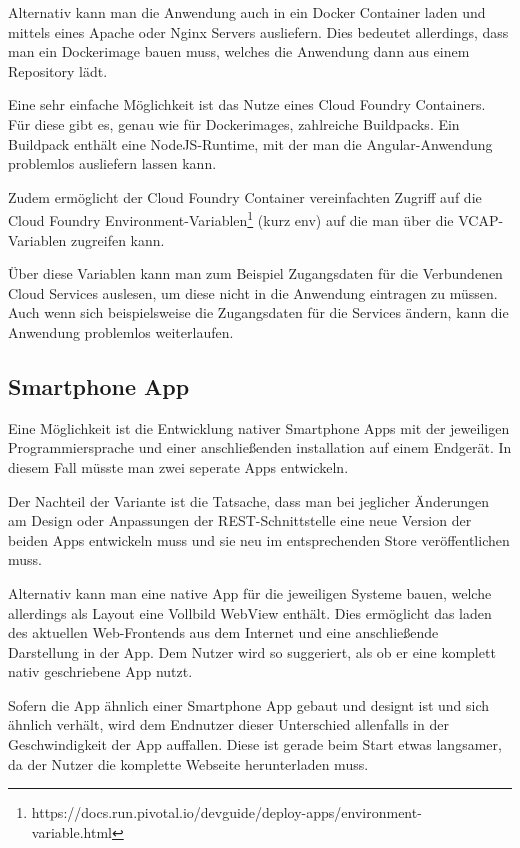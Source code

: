 Alternativ kann man die Anwendung auch in ein Docker Container laden und mittels eines Apache oder Nginx Servers
ausliefern. Dies bedeutet allerdings, dass man ein Dockerimage bauen muss, welches die Anwendung dann aus einem
Repository lädt.

Eine sehr einfache Möglichkeit ist das Nutze eines Cloud Foundry Containers. Für diese gibt es, genau wie für
Dockerimages, zahlreiche Buildpacks. Ein Buildpack enthält eine NodeJS-Runtime, mit der man die Angular-Anwendung
problemlos ausliefern lassen kann.

Zudem ermöglicht der Cloud Foundry Container vereinfachten Zugriff auf die Cloud Foundry
Environment-Variablen\footnote{https://docs.run.pivotal.io/devguide/deploy-apps/environment-variable.html} (kurz env)
auf die man über die VCAP-Variablen zugreifen kann.

Über diese Variablen kann man zum Beispiel Zugangsdaten für die Verbundenen Cloud Services auslesen, um diese nicht in
die Anwendung eintragen zu müssen. Auch wenn sich beispielsweise die Zugangsdaten für die Services ändern, kann die
Anwendung problemlos weiterlaufen.

\subsection{Smartphone App}
Eine Möglichkeit ist die Entwicklung nativer Smartphone Apps mit der jeweiligen Programmiersprache und einer
anschließenden installation auf einem Endgerät. In diesem Fall müsste man zwei seperate Apps entwickeln.

Der Nachteil der Variante ist die Tatsache, dass man bei jeglicher Änderungen am Design oder Anpassungen der
REST-Schnittstelle eine neue Version der beiden Apps entwickeln muss und sie neu im entsprechenden Store veröffentlichen
muss.

Alternativ kann man eine native App für die jeweiligen Systeme bauen, welche allerdings als Layout eine Vollbild WebView
enthält. Dies ermöglicht das laden des aktuellen Web-Frontends aus dem Internet und eine anschließende Darstellung in
der App. Dem Nutzer wird so suggeriert, als ob er eine komplett nativ geschriebene App nutzt.

Sofern die App ähnlich einer Smartphone App gebaut und designt ist und sich ähnlich verhält, wird dem Endnutzer dieser
Unterschied allenfalls in der Geschwindigkeit der App auffallen. Diese ist gerade beim Start etwas langsamer, da der
Nutzer die komplette Webseite herunterladen muss.

